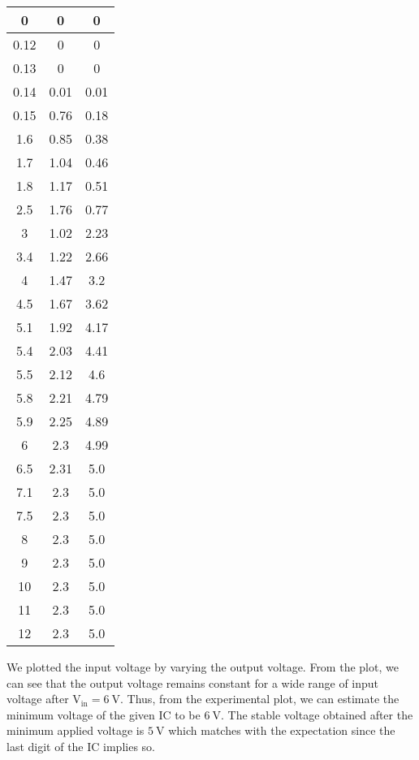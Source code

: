 \documentclass[12pt]{article}
\begin{document}
\begin{longtable}{|c|c|c|}
        0         & 0         & 0         \\ \hline
        0.12      & 0         & 0         \\ \hline
        0.13      & 0         & 0         \\ \hline
        0.14      & 0.01      & 0.01      \\ \hline
        0.15      & 0.76      & 0.18      \\ \hline
        1.6       & 0.85      & 0.38      \\ \hline
        1.7       & 1.04      & 0.46      \\ \hline
        1.8       & 1.17      & 0.51      \\ \hline
        2.5       & 1.76      & 0.77      \\ \hline
        3         & 1.02      & 2.23      \\ \hline
        3.4       & 1.22      & 2.66      \\ \hline
        4         & 1.47      & 3.2       \\ \hline
        4.5       & 1.67      & 3.62      \\ \hline
        5.1       & 1.92      & 4.17      \\ \hline
        5.4       & 2.03      & 4.41      \\ \hline
        5.5       & 2.12      & 4.6       \\ \hline
        5.8       & 2.21      & 4.79      \\ \hline
        5.9       & 2.25      & 4.89      \\ \hline
        6         & 2.3       & 4.99      \\ \hline
        6.5       & 2.31      & 5.0         \\ \hline
        7.1       & 2.3       & 5.0        \\ \hline
        7.5       & 2.3       & 5.0         \\ \hline
        8         & 2.3       & 5.0         \\ \hline
        9         & 2.3       & 5.0         \\ \hline
        10        & 2.3       & 5.0         \\ \hline
        11        & 2.3       & 5.0         \\ \hline
        12        & 2.3       & 5.0         \\ \hline
    \end{longtable}
\noindent
We plotted the input voltage by varying the output voltage. From the plot, we can see that the output voltage remains constant for a wide range of input voltage after $\mathrm{V_{in}=6 \ \mathrm{V}}$. Thus, from the experimental plot, we can estimate the minimum voltage of the given IC to be $6 \ \mathrm{V}$. The stable voltage obtained after the minimum applied voltage is $5 \ \mathrm{V}$ which matches with the expectation since the last digit of the IC implies so.
\end{document}
